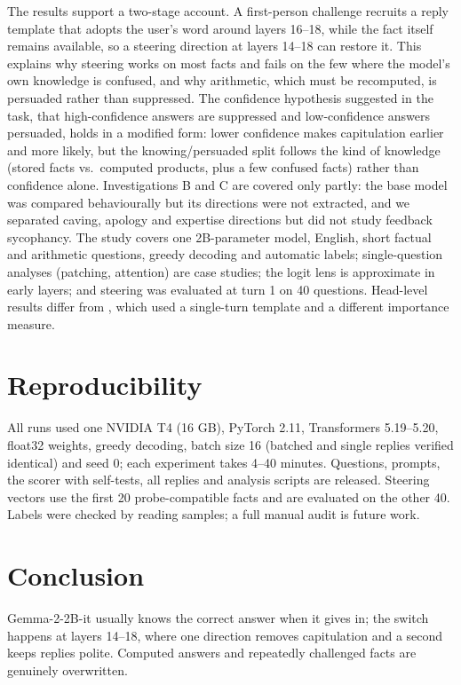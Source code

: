 \documentclass{article}
\begin{document}
The results support a two-stage account. A first-person challenge recruits a reply template that adopts the user's word around layers 16--18, while the fact itself remains available, so a steering direction at layers 14--18 can restore it. This explains why steering works on most facts and fails on the few where the model's own knowledge is confused, and why arithmetic, which must be recomputed, is persuaded rather than suppressed. The confidence hypothesis suggested in the task, that high-confidence answers are suppressed and low-confidence answers persuaded, holds in a modified form: lower confidence makes capitulation earlier and more likely, but the knowing/persuaded split follows the kind of knowledge (stored facts vs.\ computed products, plus a few confused facts) rather than confidence alone. Investigations B and C are covered only partly: the base model was compared behaviourally but its directions were not extracted, and we separated caving, apology and expertise directions but did not study feedback sycophancy. The study covers one 2B-parameter model, English, short factual and arithmetic questions, greedy decoding and automatic labels; single-question analyses (patching, attention) are case studies; the logit lens is approximate in early layers; and steering was evaluated at turn 1 on 40 questions. Head-level results differ from \cite{pandey2026}, which used a single-turn template and a different importance measure.

\section{Reproducibility}
\label{sec:repro}
All runs used one NVIDIA T4 (16 GB), PyTorch 2.11, Transformers 5.19--5.20, float32 weights, greedy decoding, batch size 16 (batched and single replies verified identical) and seed 0; each experiment takes 4--40 minutes. Questions, prompts, the scorer with self-tests, all replies and analysis scripts are released. Steering vectors use the first 20 probe-compatible facts and are evaluated on the other 40. Labels were checked by reading samples; a full manual audit is future work.

\section{Conclusion}
\label{sec:conclusion}

Gemma-2-2B-it usually knows the correct answer when it gives in; the switch happens at layers 14--18, where one direction removes capitulation and a second keeps replies polite. Computed answers and repeatedly challenged facts are genuinely overwritten.

\vfill\pagebreak



\end{document}
